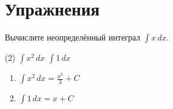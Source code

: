 \documentclass[seminar, recordsfile=records.lua]{practice}
\begin{document}
\section*{Упражнения}

\begin{exercise}
	Вычислите неопределённый интеграл $\int x \, dx$.
\end{exercise}

\begin{tasks}(2)
	\task $\int x^2 \, dx$
	\task $\int 1 \, dx$
\end{tasks}

\begin{solution}
	\begin{enumerate}
		\item $\int x^2 \, dx = \frac{x^3}{3} + C$
		\item $\int 1 \, dx = x + C$
	\end{enumerate}
\end{solution}
\end{document}
